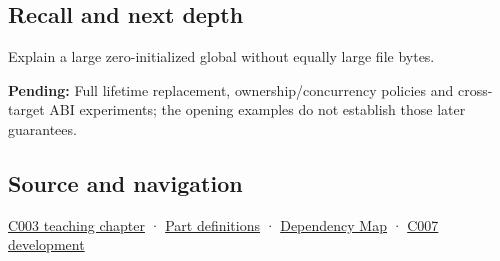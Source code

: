 \subsection{Recall and next depth}\label{appendix-17c93c4c2f19-recall-and-next-depth}

Explain a large zero-initialized global without equally large file bytes.

\textbf{Pending:} Full lifetime replacement, ownership/concurrency policies and cross-target ABI experiments; the opening examples do not establish those later guarantees.

\subsection{Source and navigation}\label{appendix-17c93c4c2f19-source-and-navigation}

\hyperref[01-foundations-i-ch002-where-the-bytes-live]{C003 teaching chapter} · \hyperref[appendix-fd090d982a15-m003---parts-41-60]{Part definitions} · \hyperref[appendix-4ad47bdd269a]{Dependency Map} · \hyperref[01-foundations-i-ch002-a-name-does-not-decide-how-long-storage-lasts]{C007 development}
